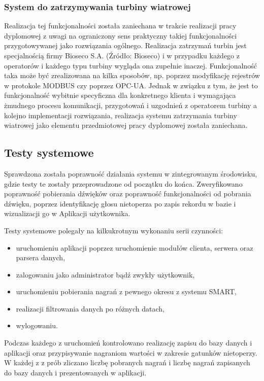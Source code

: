 \documentclass{sprz}
\begin{document}
\subsubsection{System do zatrzymywania turbiny wiatrowej}
Realizacja tej funkcjonalności została zaniechana w trakcie realizacji pracy dyplomowej z uwagi na ograniczony sens praktyczny takiej funkcjonalności przygotowywanej jako rozwiązania ogólnego. Realizacja zatrzymań turbin jest specjalnością firmy Bioseco S.A. (Źródło: Bioseco) i w przypadku każdego z operatorów i każdego typu turbiny wygląda ona zupełnie inaczej. Funkcjonalność taka może być zrealizowana na kilka sposobów, np. poprzez modyfikację rejestrów w protokole MODBUS czy poprzez OPC-UA. Jednak w związku z tym, że jest to funkcjonalność wybitnie specyficzna dla konkretnego klienta i wymagająca żmudnego procesu komunikacji, przygotowań i uzgodnień z operatorem turbiny a kolejno implementacji rozwiązania, realizacja systemu zatrzymania turbiny wiatrowej jako elementu przedmiotowej pracy dyplomowej została zaniechana.


\subsection{Testy systemowe}
Sprawdzona została poprawność działania systemu w zintegrowanym środowisku, gdzie testy te zostały przeprowadzone od początku do końca. Zweryfikowano poprawność pobierania dźwięków oraz poprawność funkcjonalności od pobrania dźwięku, poprzez identyfikację głosu nietoperza po zapis rekordu w bazie i wizualizacji go w Aplikacji użytkownika.

Testy systemowe polegały na kilkukrotnym wykonaniu serii czynności:

\begin{itemize}
  \item uruchomieniu aplikacji poprzez uruchomienie modułów clienta, serwera oraz parsera danych,
  \item zalogowaniu jako administrator bądź zwykły użytkownik,
  \item uruchomieniu pobierania nagrań z pewnego okresu z systemu SMART,
  \item realizacji filtrowania danych po różnych datach,
  \item wylogowaniu.
\end{itemize}

Podczas każdego z uruchomień kontrolowano realizację zapisu do bazy danych i aplikacji oraz przypisywanie nagraniom wartości w zakresie gatunków nietoperzy.
W każdej z z prób zliczano liczbę pobranych nagrań i liczbę nagrań zapisanych do bazy danych i prezentowanych w aplikacji.
\end{document}
